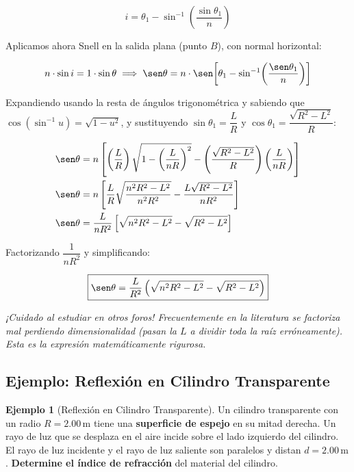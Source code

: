 \documentclass[12pt, a4paper]{article}
\theoremstyle{definition}
\newtheorem{ejemplo}{Ejemplo}[section]
\newcommand{\nota}[1]{\medskip\noindent\colorbox{grisclaro}{\parbox{0.95\linewidth}{\textit{#1}}}\medskip}
\begin{document}
\begin{equation}
  i = \theta_1 - \sin^{-1}\!\left(\frac{\sin\theta_1}{n}\right)
  \label{eq:angulo_i}
\end{equation}

Aplicamos ahora Snell en la salida plana (punto \(B\)), con normal horizontal:

\begin{equation}
  n\cdot\sin i = 1\cdot\sin\theta \implies \sen\theta = n\cdot\sen\!\left[\theta_1 -
  \sin^{-1}\!\left(\frac{\sen\theta_1}{n}\right)\right]
  \label{eq:snell_salida}
\end{equation}

Expandiendo usando la resta de ángulos trigonométrica y sabiendo que
\(\cos(\sin^{-1} u) = \sqrt{1-u^2}\), y sustituyendo
\(\sin\theta_1 = \dfrac{L}{R}\) y \(\cos\theta_1 = \dfrac{\sqrt{R^2-L^2}}{R}\):

\begin{align}
  \sen\theta &= n\left[\left(\frac{L}{R}\right)\sqrt{1 - \left(\frac{L}{nR}\right)^2} -
               \left(\frac{\sqrt{R^2-L^2}}{R}\right)\left(\frac{L}{nR}\right)\right] \nonumber \\
  \sen\theta &= n\left[\frac{L}{R}\sqrt{\frac{n^2R^2 - L^2}{n^2R^2}} -
               \frac{L\sqrt{R^2-L^2}}{nR^2}\right] \nonumber \\
  \sen\theta &= \frac{L}{nR^2}\left[\sqrt{n^2R^2-L^2} - \sqrt{R^2-L^2}\right]
  \label{eq:seno_theta}
\end{align}

Factorizando \(\dfrac{1}{nR^2}\) y simplificando:

\begin{equation}
  \boxed{\sen\theta = \frac{L}{R^2}\left(\sqrt{n^2R^2-L^2} - \sqrt{R^2-L^2}\right)}
  \label{eq:seno_theta_final}
\end{equation}

\nota{¡Cuidado al estudiar en otros foros! Frecuentemente en la literatura se factoriza mal
perdiendo dimensionalidad (pasan la \(L\) a dividir toda la raíz erróneamente). Esta es la
expresión matemáticamente rigurosa.}

\subsection{Ejemplo: Reflexión en Cilindro Transparente}
\label{sec:cilindro}

\begin{ejemplo}[Reflexión en Cilindro Transparente]
Un cilindro transparente con un radio \(R = 2.00\,\text{m}\) tiene una \textbf{superficie de
espejo} en su mitad derecha. Un rayo de luz que se desplaza en el aire incide sobre el lado
izquierdo del cilindro. El rayo de luz incidente y el rayo de luz saliente son paralelos y distan
\(d = 2.00\,\text{m}\). \textbf{Determine el índice de refracción} del material del cilindro.
\end{ejemplo}
\end{document}
